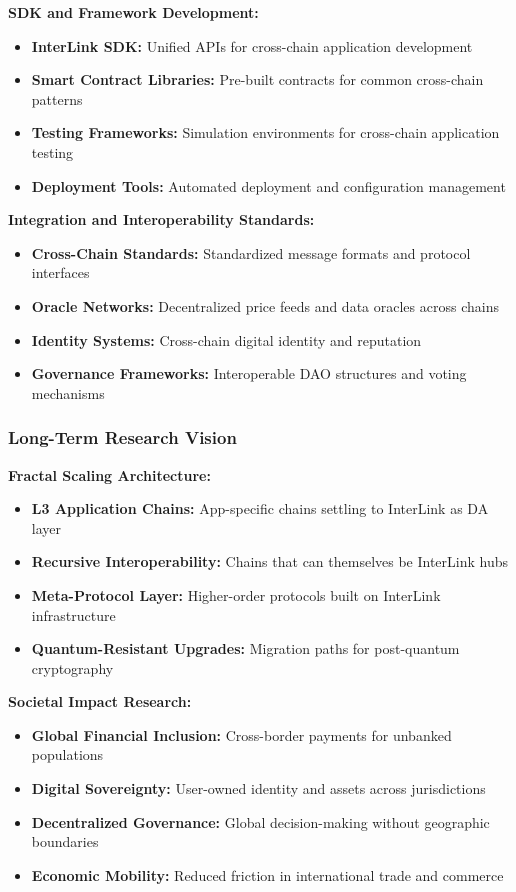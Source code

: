 \documentclass[11pt,a4paper]{article}
\begin{document}
\textbf{SDK and Framework Development:}
\begin{itemize}
    \item \textbf{InterLink SDK:} Unified APIs for cross-chain application development
    \item \textbf{Smart Contract Libraries:} Pre-built contracts for common cross-chain patterns
    \item \textbf{Testing Frameworks:} Simulation environments for cross-chain application testing
    \item \textbf{Deployment Tools:} Automated deployment and configuration management
\end{itemize}

\textbf{Integration and Interoperability Standards:}
\begin{itemize}
    \item \textbf{Cross-Chain Standards:} Standardized message formats and protocol interfaces
    \item \textbf{Oracle Networks:} Decentralized price feeds and data oracles across chains
    \item \textbf{Identity Systems:} Cross-chain digital identity and reputation
    \item \textbf{Governance Frameworks:} Interoperable DAO structures and voting mechanisms
\end{itemize}

\subsubsection{Long-Term Research Vision}

\textbf{Fractal Scaling Architecture:}
\begin{itemize}
    \item \textbf{L3 Application Chains:} App-specific chains settling to InterLink as DA layer
    \item \textbf{Recursive Interoperability:} Chains that can themselves be InterLink hubs
    \item \textbf{Meta-Protocol Layer:} Higher-order protocols built on InterLink infrastructure
    \item \textbf{Quantum-Resistant Upgrades:} Migration paths for post-quantum cryptography
\end{itemize}

\textbf{Societal Impact Research:}
\begin{itemize}
    \item \textbf{Global Financial Inclusion:} Cross-border payments for unbanked populations
    \item \textbf{Digital Sovereignty:} User-owned identity and assets across jurisdictions
    \item \textbf{Decentralized Governance:} Global decision-making without geographic boundaries
    \item \textbf{Economic Mobility:} Reduced friction in international trade and commerce
\end{itemize}
\end{document}
